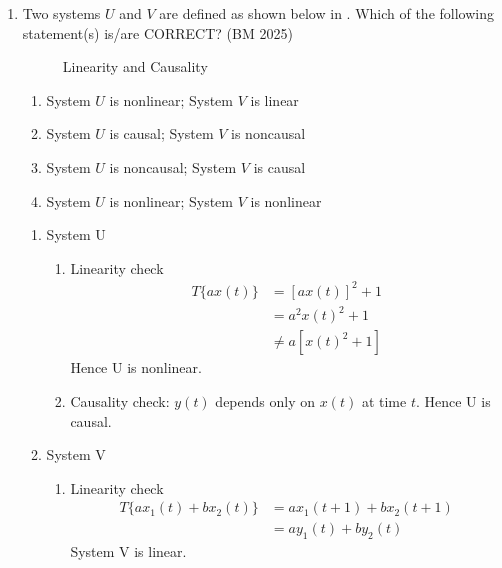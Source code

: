 \begin{enumerate}[label=\thesubsection.\arabic*,ref=\thesubsection.\theenumi]
\begin{figure}[H]
\end{figure}
\item Two systems $U$ and $V$ are defined as shown below
	in
  .
	Which of the following statement(s) is/are CORRECT?
\hfill  (BM 2025)
	\begin{figure}[H]
  \centering
  \resizebox{0.75\columnwidth}{!}{%
	  
  }
  \caption{Linearity and Causality}
  \label{fig:EE26BTECH11221-lin-cause}
\end{figure}

\begin{enumerate}
\setlength{\itemsep}{0pt}
    \item System $U$ is nonlinear; System $V$ is linear
    \item System $U$ is causal; System $V$ is noncausal
    \item System $U$ is noncausal; System $V$ is causal
    \item System $U$ is nonlinear; System $V$ is nonlinear
\end{enumerate}


\solution
\begin{enumerate}
	\item System U
\begin{enumerate}
	\item Linearity check
\begin{align}
T\{a x(t)\} &= [a x(t)]^2 + 1 \\
&= a^2 x(t)^2 + 1 \\
&\neq a [x(t)^2 + 1]
\end{align}
Hence U is nonlinear.
\item Causality check: 
$y(t)$  depends only on  $x(t)$  at time $t$.
Hence U is causal.
\end{enumerate}

	\item System V
\begin{enumerate}

	\item Linearity check
\begin{align}
T\{a x_1(t) + b x_2(t)\} &= a x_1(t + 1) + b x_2(t + 1) \\
&= a y_1(t) + b y_2(t)
\end{align}
System V is linear.


\end{enumerate}
\end{enumerate}
\end{enumerate}
